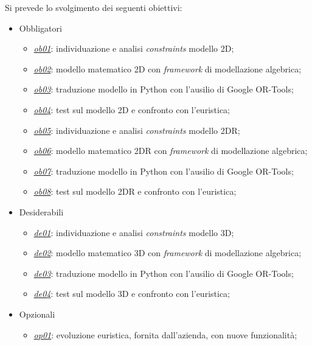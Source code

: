 Si prevede lo svolgimento dei seguenti obiettivi:
\begin{itemize}
	\item Obbligatori
	      \begin{itemize}
	      	\item \underline{\textit{ob01}}: individuazione e analisi \textit{constraints} modello 2D;
	      	\item \underline{\textit{ob02}}: modello matematico 2D con \textit{framework} di modellazione algebrica;
	      	\item \underline{\textit{ob03}}: traduzione modello in Python con l'ausilio di Google OR-Tools;
	      	\item \underline{\textit{ob04}}: test sul modello 2D e confronto con l'euristica;
	      	\item \underline{\textit{ob05}}: individuazione e analisi \textit{constraints} modello 2DR; 
	      	\item \underline{\textit{ob06}}: modello matematico 2DR con \textit{framework} di modellazione algebrica;
	      	\item \underline{\textit{ob07}}: traduzione modello in Python con l'ausilio di Google OR-Tools;
	      	\item \underline{\textit{ob08}}: test sul modello 2DR e confronto con l'euristica;
	      \end{itemize}
	\item Desiderabili
	      \begin{itemize}
	      	\item \underline{\textit{de01}}: individuazione e analisi \textit{constraints} modello 3D;
	      	\item \underline{\textit{de02}}: modello matematico 3D con \textit{framework} di modellazione algebrica;
	      	\item \underline{\textit{de03}}: traduzione modello in Python con l'ausilio di Google OR-Tools;
	      	\item \underline{\textit{de04}}: test sul modello 3D e confronto con l'euristica;
	      \end{itemize}
	\item Opzionali
	      \begin{itemize}
	      	\item \underline{\textit{op01}}: evoluzione euristica, fornita dall'azienda, con nuove funzionalità;
	      \end{itemize} 
\end{itemize}
